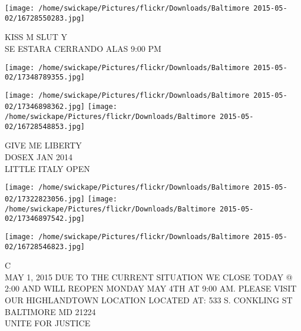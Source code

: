 \documentclass[10pt,letterpaper]{article}
\begin{document}
\vspace{0.25in}
\texttt{[image: /home/swickape/Pictures/flickr/Downloads/Baltimore 2015-05-02/16728550283.jpg]}

KISS M SLUT Y\\
SE ESTARA CERRANDO ALAS 9:00 PM\\
\pagebreak

\texttt{[image: /home/swickape/Pictures/flickr/Downloads/Baltimore 2015-05-02/17348789355.jpg]}

\vspace{0.25in}
\texttt{[image: /home/swickape/Pictures/flickr/Downloads/Baltimore 2015-05-02/17346898362.jpg]}
\texttt{[image: /home/swickape/Pictures/flickr/Downloads/Baltimore 2015-05-02/16728548853.jpg]}

GIVE ME LIBERTY\\
DOSEX JAN 2014\\
LITTLE ITALY OPEN\\
\pagebreak

\texttt{[image: /home/swickape/Pictures/flickr/Downloads/Baltimore 2015-05-02/17322823056.jpg]}
\texttt{[image: /home/swickape/Pictures/flickr/Downloads/Baltimore 2015-05-02/17346897542.jpg]}

\texttt{[image: /home/swickape/Pictures/flickr/Downloads/Baltimore 2015-05-02/16728546823.jpg]}

C\\
MAY 1, 2015  DUE TO THE CURRENT SITUATION WE CLOSE TODAY @ 2:00 AND WILL REOPEN MONDAY MAY 4TH AT 9:00 AM.  PLEASE VISIT OUR HIGHLANDTOWN LOCATION LOCATED AT: 533 S. CONKLING ST BALTIMORE MD 21224\\
UNITE FOR JUSTICE\\
\pagebreak
\end{document}
